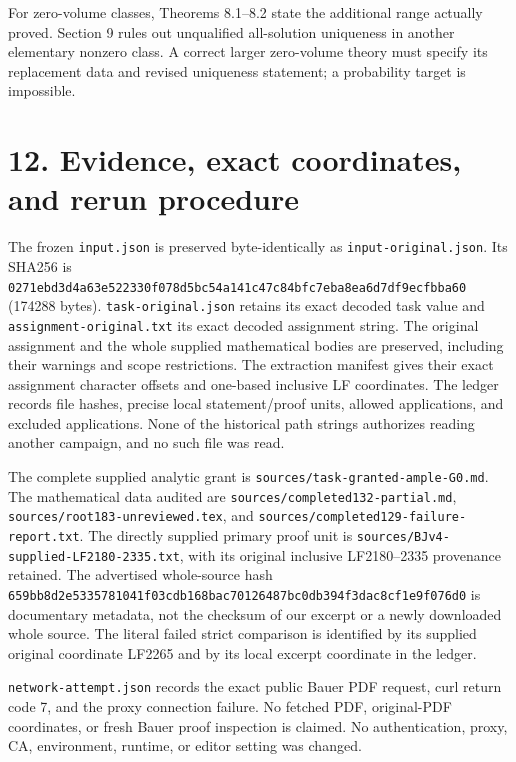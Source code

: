 \documentclass[
  10pt,
]{article}
\begin{document}
For zero-volume classes, Theorems 8.1--8.2 state the additional range
actually proved. Section 9 rules out unqualified all-solution uniqueness
in another elementary nonzero class. A correct larger zero-volume theory
must specify its replacement data and revised uniqueness statement; a
probability target is impossible.

\section{12. Evidence, exact coordinates, and rerun
procedure}\label{evidence-exact-coordinates-and-rerun-procedure}

The frozen \texttt{input.json} is preserved byte-identically as
\texttt{input-original.json}. Its SHA256 is
\nolinkurl{0271ebd3d4a63e522330f078d5bc54a141c47c84bfc7eba8ea6d7df9ecfbba60}
(174288 bytes). \texttt{task-original.json} retains its exact decoded
task value and \texttt{assignment-original.txt} its exact decoded
assignment string. The original assignment and the whole supplied
mathematical bodies are preserved, including their warnings and scope
restrictions. The extraction manifest gives their exact assignment
character offsets and one-based inclusive LF coordinates. The ledger
records file hashes, precise local statement/proof units, allowed
applications, and excluded applications. None of the historical path
strings authorizes reading another campaign, and no such file was read.

The complete supplied analytic grant is
\nolinkurl{sources/task-granted-ample-G0.md}. The mathematical data
audited are \nolinkurl{sources/completed132-partial.md},
\nolinkurl{sources/root183-unreviewed.tex}, and
\nolinkurl{sources/completed129-failure-report.txt}. The directly
supplied primary proof unit is
\nolinkurl{sources/BJv4-supplied-LF2180-2335.txt}, with its original
inclusive LF2180--2335 provenance retained. The advertised whole-source
hash
\nolinkurl{659bb8d2e5335781041f03cdb168bac70126487bc0db394f3dac8cf1e9f076d0}
is documentary metadata, not the checksum of our excerpt or a newly
downloaded whole source. The literal failed strict comparison is
identified by its supplied original coordinate LF2265 and by its local
excerpt coordinate in the ledger.

\texttt{network-attempt.json} records the exact public Bauer PDF
request, curl return code 7, and the proxy connection failure. No
fetched PDF, original-PDF coordinates, or fresh Bauer proof inspection
is claimed. No authentication, proxy, CA, environment, runtime, or
editor setting was changed.
\end{document}
